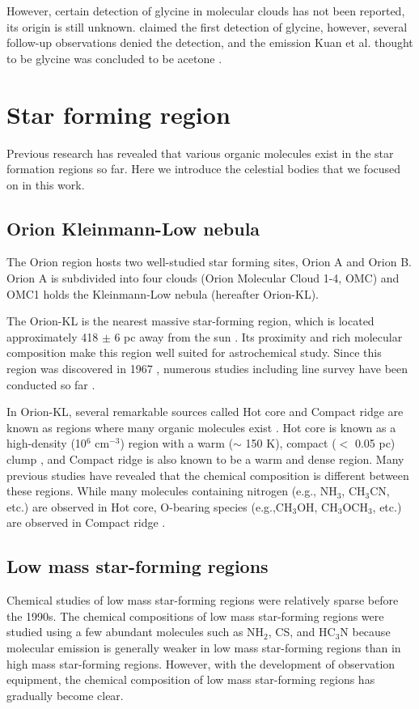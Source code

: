 However, certain detection of glycine in molecular clouds has not been reported, 
its origin is still unknown.
\citet{Kuan+2003} claimed the first detection of glycine, however, several follow-up observations 
denied the detection, and the emission Kuan et al. thought to be glycine was concluded to be acetone
\citep[e.g.,][]{Jones+2007}.

\newpage
\section{Star forming region}
Previous research has revealed that various organic molecules exist in the star formation regions so far. 
Here we introduce the celestial bodies that we focused on in this work.
\subsection{Orion Kleinmann-Low nebula}
The Orion region hosts two well-studied star forming sites, Orion A and Orion B. 
Orion A is subdivided into four clouds (Orion Molecular Cloud 1-4, OMC) and 
OMC1 holds the Kleinmann-Low nebula (hereafter Orion-KL).

The Orion-KL is the nearest massive star-forming region, which is located approximately 
418 $\pm$ 6 pc away from the sun \citep{Kim+2008}. 
Its proximity and rich molecular composition make this region well suited for astrochemical study.
Since this region was discovered in 1967 \citep*{Kleinmann+1967},
numerous studies including line survey have been conducted so far \citep[e.g.,][]{Pagani+2017, Feng+2015, Gong+2015, Turner1991}.

In Orion-KL, several remarkable sources called Hot core and Compact ridge are known as regions where many organic molecules exist \citep{Blake+1987}. 
Hot core is known as a high-density (10$^6$ cm$^{-3}$) region with a warm ($\sim$ 150 K), compact ($<$ 0.05 pc) clump \citep{Zapata+2011}, and Compact ridge is also known to be a warm and dense region. 
Many previous studies have revealed that the chemical composition is different between these regions.
While many molecules containing nitrogen (e.g., NH$_3$, CH$_3$CN, etc.) are observed 
in Hot core, 
O-bearing species (e.g.,CH$_3$OH, CH$_3$OCH$_3$, etc.) are observed in Compact ridge \citep{Favre+2011a}.

\subsection{Low mass star-forming regions}
Chemical studies of low mass star-forming regions were relatively sparse before the 1990s.
The chemical compositions of low mass star-forming regions were studied using a few abundant
molecules such as NH$_2$, CS, and HC$_3$N because molecular emission is generally weaker in low mass star-forming regions than in high mass star-forming regions. 
However, with the development of observation equipment, the chemical composition of 
low mass star-forming regions has gradually become clear.


